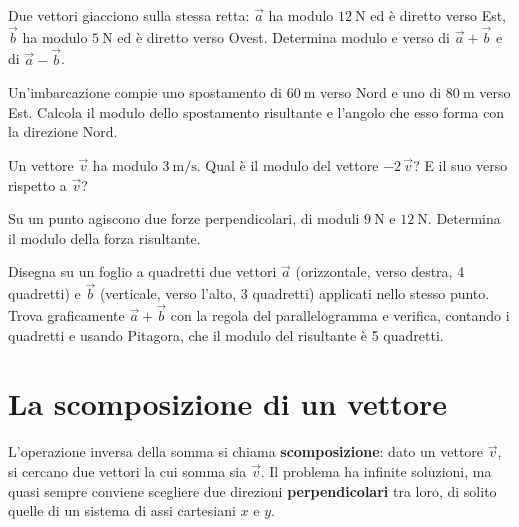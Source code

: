 \begin{esercizio}
Due vettori giacciono sulla stessa retta: $\vec{a}$ ha modulo $\SI{12}{\newton}$ ed è diretto verso Est, $\vec{b}$ ha modulo $\SI{5}{\newton}$ ed è diretto verso Ovest. Determina modulo e verso di $\vec{a}+\vec{b}$ e di $\vec{a}-\vec{b}$.\\
\end{esercizio}

\begin{esercizio}
Un'imbarcazione compie uno spostamento di $\SI{60}{\meter}$ verso Nord e uno di $\SI{80}{\meter}$ verso Est. Calcola il modulo dello spostamento risultante e l'angolo che esso forma con la direzione Nord.\\
\end{esercizio}

\begin{esercizio}
Un vettore $\vec{v}$ ha modulo $\SI{3}{\meter\per\second}$. Qual è il modulo del vettore $-2\,\vec{v}$? E il suo verso rispetto a $\vec{v}$?\\
\end{esercizio}

\begin{esercizio}
Su un punto agiscono due forze perpendicolari, di moduli $\SI{9}{\newton}$ e $\SI{12}{\newton}$. Determina il modulo della forza risultante.\\
\end{esercizio}

\begin{esercizio}
Disegna su un foglio a quadretti due vettori $\vec{a}$ (orizzontale, verso destra, 4 quadretti) e $\vec{b}$ (verticale, verso l'alto, 3 quadretti) applicati nello stesso punto. Trova graficamente $\vec{a}+\vec{b}$ con la regola del parallelogramma e verifica, contando i quadretti e usando Pitagora, che il modulo del risultante è 5 quadretti.
\end{esercizio}


\section{La scomposizione di un vettore}\label{sec:scomposizione}

L'operazione inversa della somma si chiama \textbf{scomposizione}: dato un vettore $\vec{v}$, si cercano due vettori la cui somma sia $\vec{v}$. Il problema ha infinite soluzioni, ma quasi sempre conviene scegliere due direzioni \textbf{perpendicolari} tra loro, di solito quelle di un sistema di assi cartesiani $x$ e $y$.

